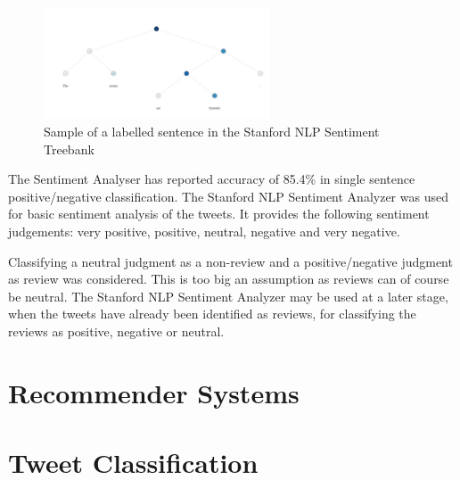 \begin{figure}
    \centering
    \includegraphics[width=0.6\textwidth]{literature_review/sample_treebank.PNG}
    \caption{Sample of a labelled sentence in the Stanford NLP Sentiment Treebank \cite{stanfordSentiment2013}}
\end{figure}

The Sentiment Analyser has reported accuracy of 85.4\% in single sentence positive/negative classification.
The Stanford NLP Sentiment Analyzer was used for basic sentiment analysis of the tweets. It provides the following sentiment judgements: very positive, positive, neutral, negative and very negative.

Classifying a neutral judgment as a non-review and a positive/negative judgment as review was considered. This is too big an assumption as reviews can of course be neutral. The Stanford NLP Sentiment Analyzer may be used at a later stage, when the tweets have already been identified as reviews, for classifying the reviews as positive, negative or neutral.

\section{Recommender Systems}
\section{Tweet Classification}